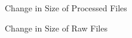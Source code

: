 \begin{figure}[h]
\centering
{}
\caption{Change in Size of Processed Files}
\label{fig:processed}
\end{figure}

\begin{figure}[h]
\centering
{}
\caption{Change in Size of Raw Files}
\label{fig:raw}
\end{figure}

